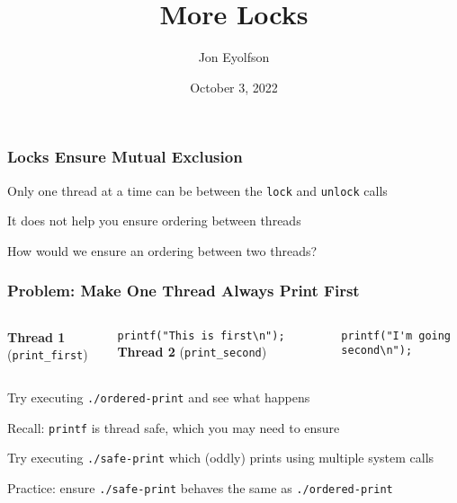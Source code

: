 

\title{More Locks}
\author{Jon Eyolfson}
\date{October 3, 2022}


  \begin{frame}
    \titlepage
  \end{frame}

  \begin{frame}
    \frametitle{Locks Ensure Mutual Exclusion}

    Only one thread at a time can be between the \texttt{lock} and
    \texttt{unlock} calls

    \vspace{2em}

    It does not help you ensure ordering between threads

    \vspace{2em}

    How would we ensure an ordering between two threads?
  \end{frame}

  \begin{frame}[fragile]
    \frametitle{Problem: Make One Thread Always Print First}

    \begin{columns}
        {\bf Thread 1} (\verb+print_first+)

        \verb+printf("This is first\n");+
        {\bf Thread 2} (\verb+print_second+)

        \verb+printf("I'm going second\n");+
    \end{columns}

    \vspace{2em}

    Try executing \texttt{./ordered-print} and see what happens

    \vspace{4em}

    Recall: \texttt{printf} is thread safe, which you may need to ensure

    \vspace{1em}

    \hspace{2em} Try executing \texttt{./safe-print} which (oddly) prints using
                 multiple system calls

    \hspace{2em} Practice: ensure \texttt{./safe-print} behaves the same as
                 \texttt{./ordered-print}
  \end{frame}

